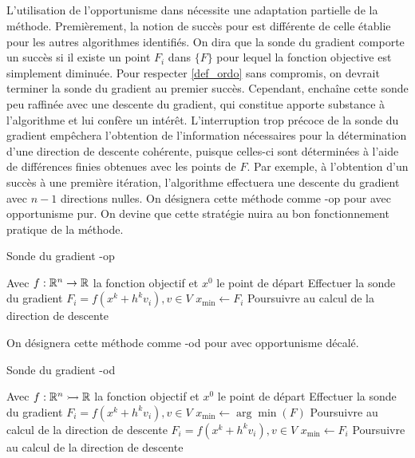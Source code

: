 \subsection{\imfil}
L'utilisation de l'opportunisme dans \imfil nécessite une adaptation partielle de la méthode. Premièrement, la notion de succès pour \imfil est différente de celle établie pour les autres algorithmes identifiés. On dira que la sonde du gradient comporte un succès si il existe un point $F_i$ dans $\{F\}$ pour lequel la fonction objective est simplement diminuée. Pour respecter \ref{def_ordo} sans compromis, on devrait terminer la sonde du gradient au premier succès. Cependant, \imfil enchaîne cette sonde peu raffinée avec une descente du gradient, qui constitue apporte substance à l'algorithme et lui confère un intérêt. L'interruption trop précoce de la sonde du gradient empêchera l'obtention de l'information nécessaires pour la détermination d'une direction de descente cohérente, puisque celles-ci sont déterminées à l'aide de différences finies obtenues avec les points de $F$. Par exemple, à l'obtention d'un succès à une première itération, l'algorithme effectuera une descente du gradient avec $n-1$ directions nulles. On désignera cette méthode comme \textsf{\imfil-op} pour \imfil avec opportunisme pur. On devine que cette stratégie nuira au bon fonctionnement pratique de la méthode.
\begin{algorithm}[H]
 	\caption{\textsf{Sonde du gradient \imfil-op}}
 	\label{alg5}
 	\begin{algorithmic}
 		\STATE Avec $f:\mathbb{R}^n \rightarrow \mathbb{R}$ la fonction objectif et $x^0$ le point de départ
 		\STATE Effectuer la sonde du gradient
 		\STATE $F_i = f(x^k + h^k v_i), v \in V$
 		\STATE $x_{\min} \leftarrow F_i$
 		\STATE Poursuivre au calcul de la direction de descente
 		\ENDIF
 		\ENDFOR
 	\end{algorithmic}
\end{algorithm}

On désignera cette méthode comme \textsf{\imfil-od} pour \imfil avec opportunisme décalé. 
  
\begin{algorithm}[H]
	\caption{\textsf{Sonde du gradient \imfil-od}}
	\label{alg5}
	\begin{algorithmic}
		\STATE Avec $f:\mathbb{R}^n \rightarrowtail \mathbb{R}$ la fonction objectif et $x^0$ le point de départ
		\STATE Effectuer la sonde du gradient
		\FOR {$i=1,\dots,n$}
		\STATE $F_i = f(x^k + h^k v_i), v \in V$
		\ENDFOR
		\IF {$f(\arg \min(F)) < f(x_k)$}
		\STATE $x_{\min} \leftarrow\arg \min(F)$
		\STATE Poursuivre au calcul de la direction de descente
		\ENDIF
		\FOR {$i=n+1,\dots,k$}
		\STATE $F_i = f(x^k + h^k v_i), v \in V$
		\IF {$F_i < x^k$}
		\STATE $x_{\min} \leftarrow F_i$
		\STATE Poursuivre au calcul de la direction de descente
		\ENDIF
		\ENDFOR
	\end{algorithmic}
\end{algorithm}  
   
